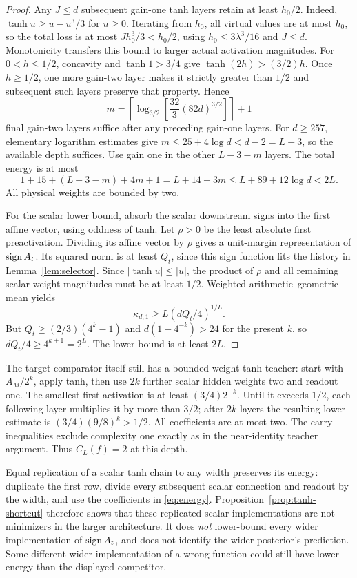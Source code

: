 \begin{proof}
Any $J\le d$ subsequent gain-one tanh layers retain at least $h_0/2$.
Indeed, $\tanh u\ge u-u^3/3$ for $u\ge0$. Iterating from $h_0$,
all virtual values are at most $h_0$, so the total loss is at most
$Jh_0^3/3<h_0/2$, using $h_0\le3\lambda^3/16$ and $J\le d$. Monotonicity transfers this bound to larger actual
activation magnitudes. For $0<h\le1/2$, concavity and
$\tanh1>3/4$ give $\tanh(2h)>(3/2)h$.
Once $h\ge1/2$, one more gain-two layer makes it strictly greater than
$1/2$ and subsequent such layers preserve that property. Hence
\[
 m=\left\lceil\log_{3/2}\!\left[\frac{32}3(82d)^{3/2}\right]
       \right\rceil+1
\]
final gain-two layers suffice after any preceding gain-one layers.
For $d\ge257$, elementary logarithm estimates give
$m\le25+4\log d<d-2=L-3$, so the available depth suffices.
Use gain one in the other $L-3-m$ layers. The total energy is at most
\[
 1+15+(L-3-m)+4m+1
 =L+14+3m\le L+89+12\log d<2L.
\]
All physical weights are bounded by two.

For the scalar lower bound, absorb the scalar downstream signs into the
first affine vector, using oddness of tanh. Let $\rho>0$ be the least
absolute first preactivation. Dividing its affine vector by $\rho$
gives a unit-margin representation of $\operatorname{sign} A_t$. Its squared norm is
at least $Q_t$, since this sign function fits the history in
Lemma~\ref{lem:selector}. Since $|\tanh u|\le|u|$, the product of
$\rho$ and all remaining scalar weight magnitudes must be at least
$1/2$. Weighted arithmetic--geometric mean yields
\[
 \kappa_{d,1}\ge L(dQ_t/4)^{1/L}.
\]
But $Q_t\ge(2/3)(4^k-1)$ and
$d(1-4^{-k})>24$ for the present $k$, so
$dQ_t/4\ge4^{k+1}=2^L$. The lower bound is at least $2L$.
\end{proof}

The target comparator itself still has a bounded-weight tanh teacher:
start with $A_M/2^k$, apply tanh, then use $2k$ further scalar hidden
weights two and readout one. The smallest first activation is at least
$(3/4)2^{-k}$. Until it exceeds $1/2$, each following layer multiplies
it by more than $3/2$; after $2k$ layers the resulting lower estimate is
$(3/4)(9/8)^k>1/2$. All coefficients are at most two. The carry
inequalities exclude complexity one exactly as in the near-identity
teacher argument. Thus $C_L(f)=2$ at this depth.

Equal replication of a scalar tanh chain to any width preserves its
energy: duplicate the first row, divide every subsequent scalar
connection and readout by the width, and use the coefficients in
\eqref{eq:energy}. Proposition~\ref{prop:tanh-shortcut} therefore shows
that these replicated scalar implementations are not minimizers in the
larger architecture. It does \emph{not} lower-bound every wider
implementation of $\operatorname{sign} A_t$, and does not identify the wider posterior's
prediction. Some different wider implementation of a wrong function
could still have lower energy than the displayed competitor.
